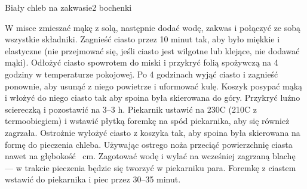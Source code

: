 \documentclass[a4paper,12pt]{article}
\begin{document}
\begin{recipe}{Biały chleb na zakwasie}{2 bochenki}{}

W misce zmieszać mąkę z solą, następnie dodać wodę, zakwas i połączyć ze sobą
wszystkie składniki. Zagnieść ciasto przez 10 minut tak, aby było miękkie i
elastyczne (nie przejmować się, jeśli ciasto jest wilgotne lub klejące, nie
dodawać mąki).  
\freeform%
Odłożyć ciasto spowrotem do miski i przykryć folią spożywczą na
4 godziny w temperaturze pokojowej. Po 4 godzinach wyjąć ciasto i zagnieść
ponownie, aby usunąć z niego powietrze i uformować kulę.
Koszyk posypać mąką i włożyć do niego ciasto tak aby spoina była skierowana do
góry. Przykryć luźno sciereczką i pozostawić na 3--3 h. Piekarnik
ustawić na 230\0C (210\0C z termoobiegiem) i wstawić płytką foremkę
na spód piekarnika, aby się również zagrzała. Ostrożnie wyłożyć
ciasto z koszyka tak, aby spoina była skierowana na formę do pieczenia chleba. Używając ostrego
noża przeciąć powierzchnię ciasta nawet na głębokość  cm. Zagotować
wodę i wylać na wcześniej zagrzaną blachę --- w trakcie pieczenia
będzie się tworzyć w piekarniku para. Foremkę z ciastem wstawić do piekarnika i
piec przez 30--35 minut.

\end{recipe}
\end{document}
